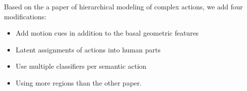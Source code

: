 Based on the a paper of hierarchical modeling of complex actions, we add four modifications:
\begin{itemize}
\item Add motion cues in addition to the basal geometric  features
\item Latent assignments of actions into human parts
\item Use multiple classifiers per semantic action
\item Using more regions than the other paper.
\end{itemize}